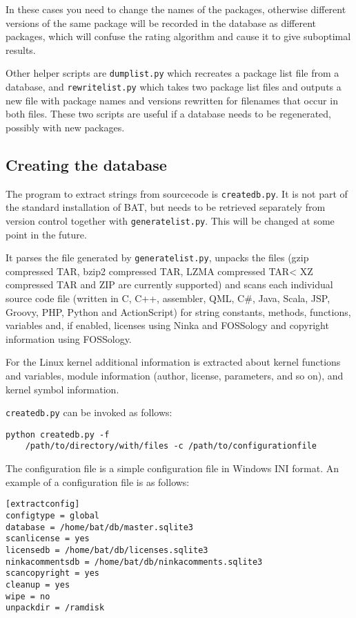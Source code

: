 \documentclass[10pt]{article}
\begin{document}
In these cases you need to change the names of the packages, otherwise
different versions of the same package will be recorded in the database as
different packages, which will confuse the rating algorithm and cause it to
give suboptimal results.

Other helper scripts are \texttt{dumplist.py} which recreates a package list
file from a database, and \texttt{rewritelist.py} which takes two package list
files and outputs a new file with package names and versions rewritten for
filenames that occur in both files. These two scripts are useful if a database
needs to be regenerated, possibly with new packages.

\subsection{Creating the database}

The program to extract strings from sourcecode is \texttt{createdb.py}. It is
not part of the standard installation of BAT, but needs to be retrieved
separately from version control together with \texttt{generatelist.py}. This
will be changed at some point in the future.

It parses the file generated by \texttt{generatelist.py}, unpacks the files
(gzip compressed TAR, bzip2 compressed TAR, LZMA compressed TAR< XZ compressed
TAR and ZIP are currently supported) and scans each individual source code file
(written in C, C++, assembler, QML, C\#, Java, Scala, JSP, Groovy, PHP, Python
and ActionScript) for string constants, methods, functions, variables and, if
enabled, licenses using Ninka and FOSSology and copyright information using
FOSSology.

For the Linux kernel additional information is extracted about kernel functions
and variables, module information (author, license, parameters, and so on),
and kernel symbol information.

\texttt{createdb.py} can be invoked as follows:

\begin{verbatim}
python createdb.py -f
    /path/to/directory/with/files -c /path/to/configurationfile
\end{verbatim}

The configuration file is a simple configuration file in Windows INI format. An
example of a configuration file is as follows:

\begin{verbatim}
[extractconfig]
configtype = global
database = /home/bat/db/master.sqlite3
scanlicense = yes
licensedb = /home/bat/db/licenses.sqlite3
ninkacommentsdb = /home/bat/db/ninkacomments.sqlite3
scancopyright = yes
cleanup = yes
wipe = no
unpackdir = /ramdisk
\end{verbatim}
\end{document}
